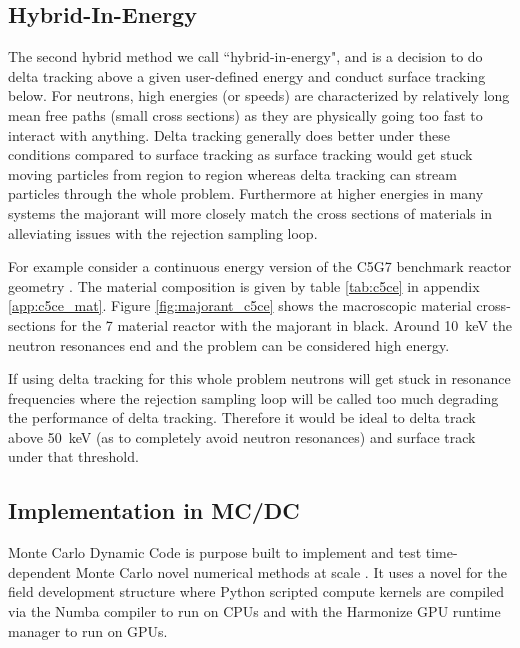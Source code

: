 \subsection{Hybrid-In-Energy}
\label{sec:cutoff}

The second hybrid method we call ``hybrid-in-energy", and is a decision to do delta tracking above a given user-defined energy and conduct surface tracking below.
For neutrons, high energies (or speeds) are characterized by relatively long mean free paths (small cross sections) as they are physically going too fast to interact with anything.
Delta tracking generally does better under these conditions compared to surface tracking as surface tracking would get stuck moving particles from region to region whereas delta tracking can stream particles through the whole problem.
Furthermore at higher energies in many systems the majorant will more closely match the cross sections of materials in alleviating issues with the rejection sampling loop.

For example consider a continuous energy version of the C5G7 benchmark reactor geometry \cite{jia_hou_oecdnea_2017}.
The material composition is given by table \ref{tab:c5ce} in appendix \ref{app:c5ce_mat}.
Figure \ref{fig:majorant_c5ce} shows the macroscopic material cross-sections for the 7 material reactor with the majorant in black.
Around \SI{10}{\kilo\electronvolt} the neutron resonances end and the problem can be considered high energy.

If using delta tracking for this whole problem neutrons will get stuck in resonance frequencies where the rejection sampling loop will be called too much degrading the performance of delta tracking.
Therefore it would be ideal to delta track above \SI{50}{\kilo\electronvolt} (as to completely avoid neutron resonances) and surface track under that threshold.

\subsection{Implementation in MC/DC}
\label{sec:implementation}

Monte Carlo Dynamic Code is purpose built to implement and test time-dependent Monte Carlo novel numerical methods at scale \cite{morgan_2025_monte}.
It uses a novel for the field development structure where Python scripted compute kernels are compiled via the Numba compiler to run on CPUs and with the Harmonize GPU runtime manager to run on GPUs.

